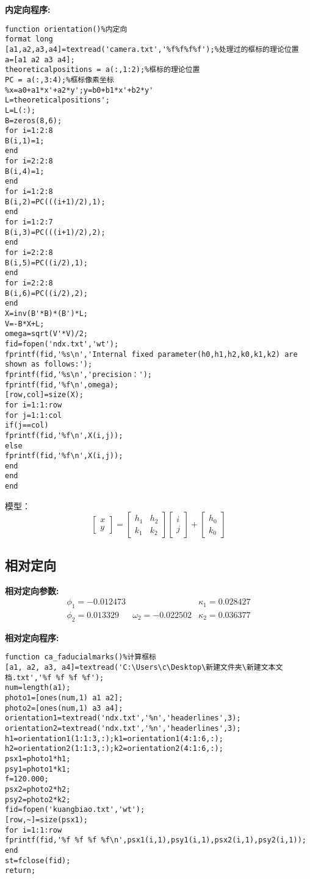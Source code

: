 \textbf{内定向程序:}
\begin{lstlisting}[caption=orientation.m文件]
function orientation()%内定向
format long
[a1,a2,a3,a4]=textread('camera.txt','%f%f%f%f');%处理过的框标的理论位置
a=[a1 a2 a3 a4];
theoreticalpositions = a(:,1:2);%框标的理论位置
PC = a(:,3:4);%框标像素坐标
%x=a0+a1*x'+a2*y';y=b0+b1*x'+b2*y'
L=theoreticalpositions';
L=L(:);
B=zeros(8,6);
for i=1:2:8
B(i,1)=1;
end
for i=2:2:8
B(i,4)=1;
end
for i=1:2:8
B(i,2)=PC(((i+1)/2),1);
end
for i=1:2:7
B(i,3)=PC(((i+1)/2),2);
end
for i=2:2:8
B(i,5)=PC((i/2),1);
end
for i=2:2:8
B(i,6)=PC((i/2),2);
end
X=inv(B'*B)*(B')*L;
V=-B*X+L;
omega=sqrt(V'*V)/2;
fid=fopen('ndx.txt','wt');
fprintf(fid,'%s\n','Internal fixed parameter(h0,h1,h2,k0,k1,k2) are shown as follows:');
fprintf(fid,'%s\n','precision：');
fprintf(fid,'%f\n',omega);
[row,col]=size(X);
for i=1:1:row
for j=1:1:col
if(j==col)
fprintf(fid,'%f\n',X(i,j));
else
fprintf(fid,'%f\n',X(i,j));
end
end
end
\end{lstlisting}

模型：
\begin{equation}
\begin{bmatrix}
x \\ y
\end{bmatrix}
=\begin{bmatrix}
h_1 & h_2 \\
k_1 & k_2 
\end{bmatrix}
\begin{bmatrix}
i \\ j
\end{bmatrix}
+\begin{bmatrix}
h_0 \\ k_0
\end{bmatrix}
\end{equation}

\subsection{相对定向}
\textbf{相对定向参数:}
\begin{equation}
\begin{array}{lll}
\phi_1=-0.012473 & & \kappa_1=0.028427 \\
\phi_2=0.013329 & \omega_2=-0.022502 & \kappa_2=0.036377
\end{array}
\end{equation}

\textbf{相对定向程序:}
\begin{lstlisting}[caption=ca\_faducialmarks.m文件]
function ca_faducialmarks()%计算框标
[a1, a2, a3, a4]=textread('C:\Users\c\Desktop\新建文件夹\新建文本文档.txt','%f %f %f %f');
num=length(a1);
photo1=[ones(num,1) a1 a2];
photo2=[ones(num,1) a3 a4];
orientation1=textread('ndx.txt','%n','headerlines',3);
orientation2=textread('ndx.txt','%n','headerlines',3);
h1=orientation1(1:1:3,:);k1=orientation1(4:1:6,:);
h2=orientation2(1:1:3,:);k2=orientation2(4:1:6,:);
psx1=photo1*h1;
psy1=photo1*k1;
f=120.000;
psx2=photo2*h2;
psy2=photo2*k2;
fid=fopen('kuangbiao.txt','wt');
[row,~]=size(psx1);
for i=1:1:row
fprintf(fid,'%f %f %f %f\n',psx1(i,1),psy1(i,1),psx2(i,1),psy2(i,1));
end
st=fclose(fid);
return;
\end{lstlisting}

